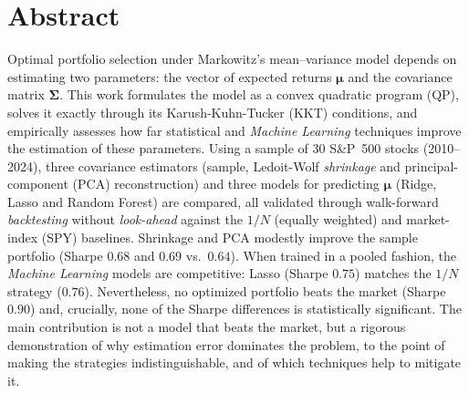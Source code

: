 \chapter*{Abstract}
Optimal portfolio selection under Markowitz's mean--variance model depends on
estimating two parameters: the vector of expected returns $\boldsymbol{\mu}$ and
the covariance matrix $\boldsymbol{\Sigma}$. This work formulates the model as a
convex quadratic program (QP), solves it exactly through its Karush-Kuhn-Tucker
(KKT) conditions, and empirically assesses how far statistical and
\textit{Machine Learning} techniques improve the estimation of these parameters.
Using a sample of 30 S\&P~500 stocks (2010--2024), three covariance estimators
(sample, Ledoit-Wolf \textit{shrinkage} and principal-component (PCA)
reconstruction) and three models for predicting $\boldsymbol{\mu}$ (Ridge, Lasso
and Random Forest) are compared, all validated through walk-forward
\textit{backtesting} without \textit{look-ahead} against the $1/N$ (equally
weighted) and market-index (SPY) baselines. Shrinkage and PCA modestly improve
the sample portfolio (Sharpe $0.68$ and $0.69$ vs.\ $0.64$). When trained in a
pooled fashion, the \textit{Machine Learning} models are competitive: Lasso
(Sharpe $0.75$) matches the $1/N$ strategy ($0.76$). Nevertheless, no optimized
portfolio beats the market (Sharpe $0.90$) and, crucially, none of the Sharpe
differences is statistically significant. The main contribution is not a model
that beats the market, but a rigorous demonstration of why estimation error
dominates the problem, to the point of making the strategies indistinguishable,
and of which techniques help to mitigate it.


\MediaOptionLogicBlank